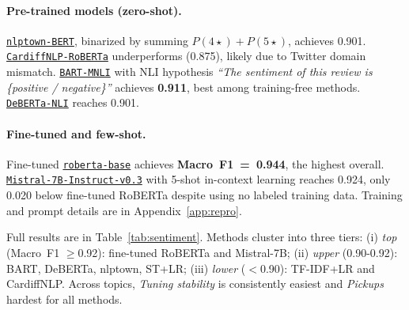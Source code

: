 \documentclass[11pt]{article}
\begin{document}
\paragraph{Pre-trained models (zero-shot).} \href{https://huggingface.co/nlptown/bert-base-multilingual-uncased-sentiment}{\texttt{nlptown-BERT}}, binarized by summing $P(\text{4}{\star})+P(\text{5}{\star})$,
achieves 0.901.
\href{https://huggingface.co/cardiffnlp/twitter-roberta-base-sentiment-latest}{\texttt{CardiffNLP-RoBERTa}}
underperforms (0.875), likely due to Twitter domain mismatch.
\href{https://huggingface.co/facebook/bart-large-mnli}{\texttt{BART-MNLI}}
\cite{lewis2020bart} with NLI hypothesis \textit{``The sentiment of
this review is \{positive / negative\}''} achieves \textbf{0.911},
best among training-free methods.
\href{https://huggingface.co/cross-encoder/nli-deberta-v3-large}{\texttt{DeBERTa-NLI}}
reaches 0.901.

\paragraph{Fine-tuned and few-shot.}
Fine-tuned \href{https://huggingface.co/FacebookAI/roberta-base}{\texttt{roberta-base}}
\cite{liu2019roberta} achieves \textbf{Macro~F1~=~0.944}, the
highest overall.
\href{https://huggingface.co/mistralai/Mistral-7B-Instruct-v0.3}{\texttt{Mistral-7B-Instruct-v0.3}}
\cite{jiang2023mistral} with 5-shot in-context learning
\cite{brown2020fewshot} reaches 0.924, only 0.020 below fine-tuned
RoBERTa despite using no labeled training data.
Training and prompt details are in Appendix~\ref{app:repro}.

Full results are in Table~\ref{tab:sentiment}.
Methods cluster into three tiers:
(i) \textit{top} (Macro~F1 $\geq$0.92): fine-tuned RoBERTa and
Mistral-7B;
(ii) \textit{upper} (0.90-0.92): BART, DeBERTa, nlptown, ST+LR;
(iii) \textit{lower} ($<$0.90): TF-IDF+LR and CardiffNLP.
Across topics, \textit{Tuning stability} is consistently easiest
and \textit{Pickups} hardest for all methods.
\end{document}
